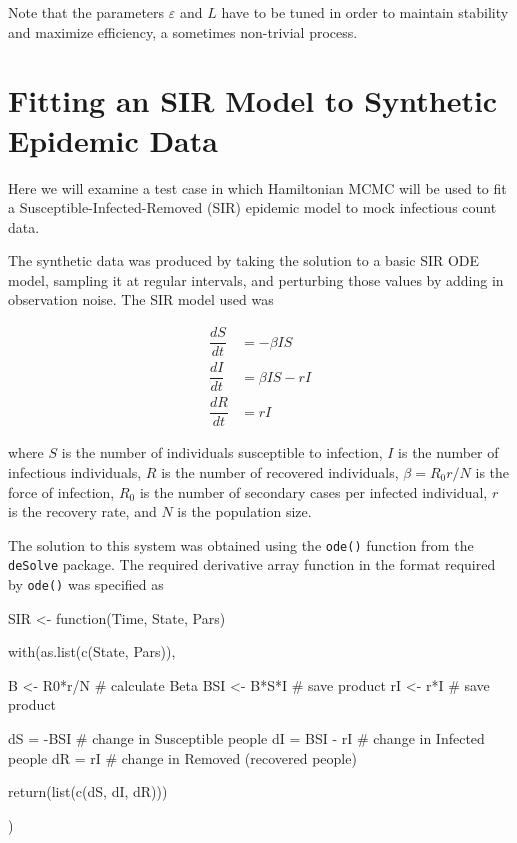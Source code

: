     Note that the parameters $\varepsilon$ and $L$ have to be tuned in order to maintain stability and maximize efficiency, a sometimes non-trivial process.
    

\section{Fitting an SIR Model to Synthetic Epidemic Data}

    Here we will examine a test case in which Hamiltonian MCMC will be used to fit a Susceptible-Infected-Removed (SIR) epidemic model to mock infectious count data.

    The synthetic data was produced by taking the solution to a basic SIR ODE model, sampling it at regular intervals, and perturbing those values by adding in observation noise. The SIR model used was

    \begin{equation}
        \begin{array}{rl}
            \dfrac{dS}{dt} & = - \beta I S \\
            \dfrac{dI}{dt} & = \beta I S - rI  \\
            \dfrac{dR}{dt} & = rI
        \end{array}
    \end{equation}

    where $S$ is the number of individuals susceptible to infection, $I$ is the number of infectious individuals, $R$ is the number of recovered individuals, $\beta = R_0 r / N$ is the force of infection, $R_0$ is the number of secondary cases per infected individual, $r$ is the recovery rate, and $N$ is the population size.

    The solution to this system was obtained using the \verb|ode()| function from the \verb|deSolve| package. The required derivative array function in the format required by \verb|ode()| was specified as

    \begin{R}    
    SIR <- function(Time, State, Pars) {

        with(as.list(c(State, Pars)), {
            
            B   <- R0*r/N    # calculate Beta
            BSI <- B*S*I     # save product
            rI  <- r*I       # save product
            
            dS = -BSI       # change in Susceptible people
            dI = BSI - rI   # change in Infected people
            dR = rI         # change in Removed (recovered people)
            
            return(list(c(dS, dI, dR)))
            
        })
        
    }
    \end{R}

